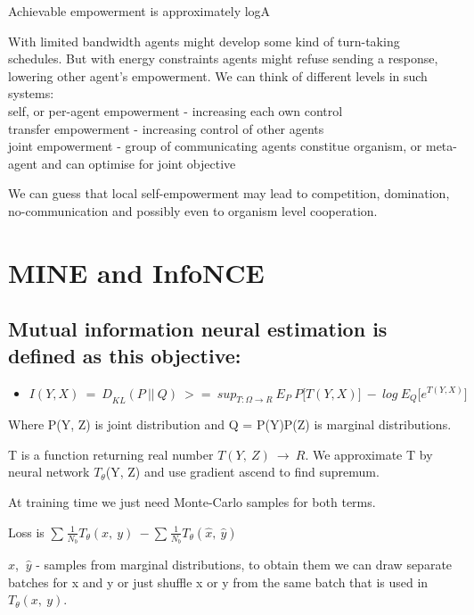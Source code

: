 Achievable empowerment is approximately log\textbar A\textbar{}

With limited bandwidth agents might develop some kind of turn-taking schedules. But with energy constraints agents might refuse sending a response, lowering other agent's empowerment. We can think of different levels in such systems:\\
self, or per-agent empowerment - increasing each own control\\
transfer empowerment - increasing control of other agents\\
joint empowerment - group of communicating agents constitue organism, or meta-agent and can optimise for joint objective

We can guess that local self-empowerment may lead to competition, domination, no-communication and possibly even to organism level cooperation.

\section{MINE and InfoNCE}\label{mine-and-infonce}

\subsection{Mutual information neural estimation is defined as this objective:}\label{mutual-information-neural-estimation-is-defined-as-this-objective}

\begin{itemize}
\item
  ${I(Y,X)\  = \ D}_{KL}(P\ ||\ Q)\  > = \ sup_{T:\Omega \rightarrow R}\ E_{P}\ P\lbrack T(Y,X)\rbrack\  - \ log\ E_{Q}\lbrack e^{T(Y,X)}\rbrack$
\end{itemize}

Where P(Y, Z) is joint distribution and Q = P(Y)P(Z) is marginal distributions.

T is a function returning real number $T(Y,\ Z)\  \rightarrow \ R$. We approximate T by neural network $T_{\theta}$(Y, Z) and use gradient ascend to find supremum.

At training time we just need Monte-Carlo samples for both terms.

Loss is $\sum_{}^{}\frac{1}{N_{b}}T_{\theta}(x,\ y)\  - \sum_{}^{}\frac{1}{N_{b}}T_{\theta}(\widehat{x},\ \widehat{y})\ $

$\widehat{x}$, $\ \widehat{y}$ - samples from marginal distributions, to obtain them we can draw separate batches for x and y or just shuffle x or y from the same batch that is used in $T_{\theta}(x,\ y)$.

